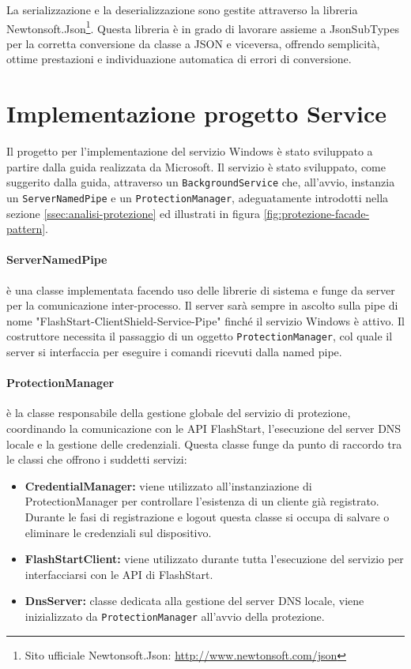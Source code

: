\documentclass[12pt,a4paper,openright,twoside]{book}
\newcommand{\itemdef}[1]{\item \textbf{#1}}
\newcommand{\class}[1]{\texttt{#1}}
\begin{document}
La serializzazione e la deserializzazione sono gestite attraverso la libreria Newtonsoft.Json\footnote{Sito ufficiale Newtonsoft.Json: \url{http://www.newtonsoft.com/json}}. Questa libreria è in grado di lavorare assieme a JsonSubTypes per la corretta conversione da classe a JSON e viceversa, offrendo semplicità, ottime prestazioni e individuazione automatica di errori di conversione.

\section{Implementazione progetto Service}

Il progetto per l'implementazione del servizio Windows è stato sviluppato a partire dalla guida \cite{MicrosoftServices2021} realizzata da Microsoft.
Il servizio è stato sviluppato, come suggerito dalla guida, attraverso un \class{BackgroundService} che, all'avvio, instanzia un \class{ServerNamedPipe} e un \class{ProtectionManager}, adeguatamente introdotti nella sezione \ref{ssec:analisi-protezione} ed illustrati in figura \ref{fig:protezione-facade-pattern}.

\paragraph{ServerNamedPipe} è una classe implementata facendo uso delle librerie di sistema e funge da server per la comunicazione inter-processo.
Il server sarà sempre in ascolto sulla pipe di nome "FlashStart-ClientShield-Service-Pipe" finché il servizio Windows è attivo.
Il costruttore necessita il passaggio di un oggetto \class{ProtectionManager}, col quale il server si interfaccia per eseguire i comandi ricevuti dalla named pipe.

\paragraph{ProtectionManager} è la classe responsabile della gestione globale del servizio di protezione, coordinando la comunicazione con le API FlashStart, l'esecuzione del server \gls{DNS} locale e la gestione delle credenziali.
Questa classe funge da punto di raccordo tra le classi che offrono i suddetti servizi:
\begin{itemize}
	\itemdef{CredentialManager:} viene utilizzato all'instanziazione di {ProtectionManager} per controllare l'esistenza di un cliente già registrato.
	Durante le fasi di registrazione e logout questa classe si occupa di salvare o eliminare le credenziali sul dispositivo.
	
	\itemdef{FlashStartClient:} viene utilizzato durante tutta l'esecuzione del servizio per interfacciarsi con le API di FlashStart.
	
	\itemdef{DnsServer:} classe dedicata alla gestione del server \gls{DNS} locale, viene inizializzato da \class{ProtectionManager} all'avvio della protezione.
\end{itemize}
\end{document}
